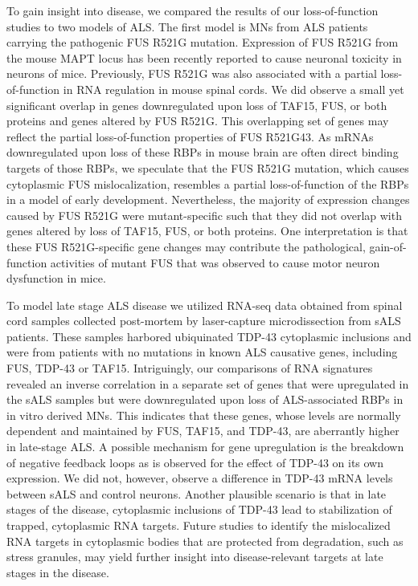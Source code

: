 To gain insight into disease, we compared the results of our loss-of-function studies to two models of ALS. The first model is MNs from ALS patients carrying the pathogenic FUS R521G mutation. Expression of FUS R521G from the mouse MAPT locus has been recently reported to cause neuronal toxicity in neurons of mice\cite{Sharma2016}. Previously, FUS R521G was also associated with a partial loss-of-function in RNA regulation in mouse spinal cords\cite{Sephton2014}. We did observe a small yet significant overlap in genes downregulated upon loss of TAF15, FUS, or both proteins and genes altered by FUS R521G. This overlapping set of genes may reflect the partial loss-of-function properties of FUS R521G43. As mRNAs downregulated upon loss of these RBPs in mouse brain are often direct binding targets of those RBPs, we speculate that the FUS R521G mutation, which causes cytoplasmic FUS mislocalization, resembles a partial loss-of-function of the RBPs in a model of early development. Nevertheless, the majority of expression changes caused by FUS R521G were mutant-specific such that they did not overlap with genes altered by loss of TAF15, FUS, or both proteins. One interpretation is that these FUS R521G-specific gene changes may contribute the pathological, gain-of-function activities of mutant FUS that was observed to cause motor neuron dysfunction in mice\cite{Sharma2016}.


To model late stage ALS disease we utilized RNA-seq data obtained from spinal cord samples collected post-mortem by laser-capture microdissection from sALS patients. These samples harbored ubiquinated TDP-43 cytoplasmic inclusions and were from patients with no mutations in known ALS causative genes, including FUS, TDP-43 or TAF15. Intriguingly, our comparisons of RNA signatures revealed an inverse correlation in a separate set of genes that were upregulated in the sALS samples but were downregulated upon loss of ALS-associated RBPs in in vitro derived MNs. This indicates that these genes, whose levels are normally dependent and maintained by FUS, TAF15, and TDP-43, are aberrantly higher in late-stage ALS. A possible mechanism for gene upregulation is the breakdown of negative feedback loops as is observed for the effect of TDP-43 on its own expression\cite{Budini2011,Polymenidou2012}. We did not, however, observe a difference in TDP-43 mRNA levels between sALS and control neurons. Another plausible scenario is that in late stages of the disease, cytoplasmic inclusions of TDP-43 lead to stabilization of trapped, cytoplasmic RNA targets. Future studies to identify the mislocalized RNA targets in cytoplasmic bodies that are protected from degradation, such as stress granules, may yield further insight into disease-relevant targets at late stages in the disease.


